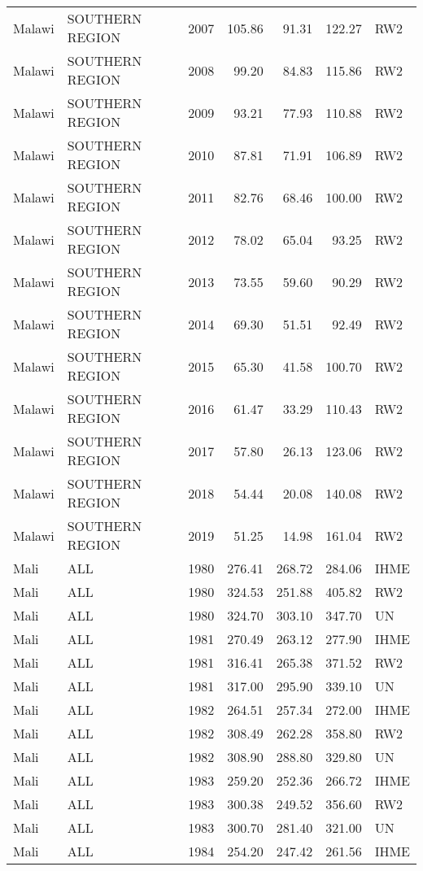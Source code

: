 \begin{longtable}{lllrrrl}
  Malawi & SOUTHERN REGION & 2007 & 105.86 & 91.31 & 122.27 & RW2 \\ 
  Malawi & SOUTHERN REGION & 2008 & 99.20 & 84.83 & 115.86 & RW2 \\ 
  Malawi & SOUTHERN REGION & 2009 & 93.21 & 77.93 & 110.88 & RW2 \\ 
  Malawi & SOUTHERN REGION & 2010 & 87.81 & 71.91 & 106.89 & RW2 \\ 
  Malawi & SOUTHERN REGION & 2011 & 82.76 & 68.46 & 100.00 & RW2 \\ 
  Malawi & SOUTHERN REGION & 2012 & 78.02 & 65.04 & 93.25 & RW2 \\ 
  Malawi & SOUTHERN REGION & 2013 & 73.55 & 59.60 & 90.29 & RW2 \\ 
  Malawi & SOUTHERN REGION & 2014 & 69.30 & 51.51 & 92.49 & RW2 \\ 
  Malawi & SOUTHERN REGION & 2015 & 65.30 & 41.58 & 100.70 & RW2 \\ 
  Malawi & SOUTHERN REGION & 2016 & 61.47 & 33.29 & 110.43 & RW2 \\ 
  Malawi & SOUTHERN REGION & 2017 & 57.80 & 26.13 & 123.06 & RW2 \\ 
  Malawi & SOUTHERN REGION & 2018 & 54.44 & 20.08 & 140.08 & RW2 \\ 
  Malawi & SOUTHERN REGION & 2019 & 51.25 & 14.98 & 161.04 & RW2 \\ 
  Mali & ALL & 1980 & 276.41 & 268.72 & 284.06 & IHME \\ 
  Mali & ALL & 1980 & 324.53 & 251.88 & 405.82 & RW2 \\ 
  Mali & ALL & 1980 & 324.70 & 303.10 & 347.70 & UN \\ 
  Mali & ALL & 1981 & 270.49 & 263.12 & 277.90 & IHME \\ 
  Mali & ALL & 1981 & 316.41 & 265.38 & 371.52 & RW2 \\ 
  Mali & ALL & 1981 & 317.00 & 295.90 & 339.10 & UN \\ 
  Mali & ALL & 1982 & 264.51 & 257.34 & 272.00 & IHME \\ 
  Mali & ALL & 1982 & 308.49 & 262.28 & 358.80 & RW2 \\ 
  Mali & ALL & 1982 & 308.90 & 288.80 & 329.80 & UN \\ 
  Mali & ALL & 1983 & 259.20 & 252.36 & 266.72 & IHME \\ 
  Mali & ALL & 1983 & 300.38 & 249.52 & 356.60 & RW2 \\ 
  Mali & ALL & 1983 & 300.70 & 281.40 & 321.00 & UN \\ 
  Mali & ALL & 1984 & 254.20 & 247.42 & 261.56 & IHME \\ 

\end{longtable}
